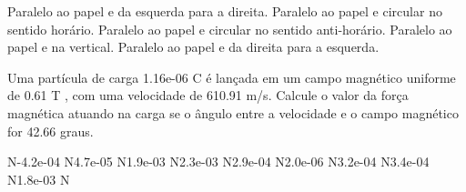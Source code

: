 \documentclass[12pt, addpoints]{exam}
\begin{document}
\begin{questions}
\begin{multicols*}{2}
        

\begin{choices}
\choice Paralelo ao papel e da esquerda para a direita. 
\choice Paralelo ao papel e circular no sentido horário. 
\choice Paralelo ao papel e circular no sentido anti-horário. 
\choice Paralelo ao papel e na vertical. 
\choice Paralelo ao papel e da direita para a esquerda. 
\end{choices}
\question Uma partícula de carga 1.16e-06 C é lançada em um campo magnético uniforme de    0.61 T , com uma velocidade de 610.91 m/s. Calcule o valor da força magnética atuando na carga se o ângulo entre a velocidade e o campo magnético for   42.66 graus.

\begin{oneparchoices}
 N\choice -4.2e-04 N\choice 4.7e-05 N\choice 1.9e-03 N\choice 2.3e-03 N\choice 2.9e-04 N\choice 2.0e-06 N\choice 3.2e-04 N\choice 3.4e-04 N\choice 1.8e-03 N
\end{oneparchoices}\end{multicols*}
\end{questions}
\newpage
\end{document}
